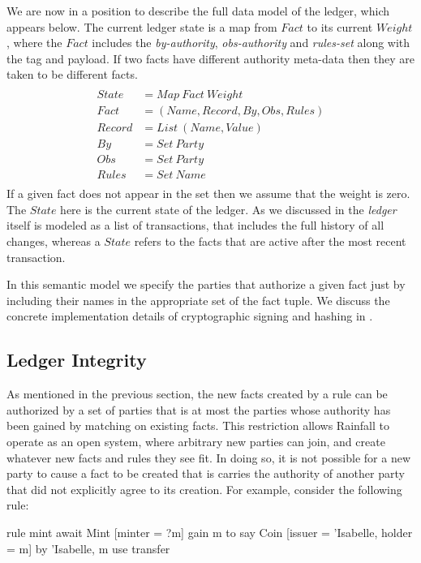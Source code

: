 We are now in a position to describe the full data model of the ledger, which appears below. The current ledger state is a map from $Fact$ to its current $Weight$, where the $Fact$ includes the \emph{by-authority}, \emph{obs-authority} and \emph{rules-set} along with the tag and payload. If two facts have different authority meta-data then they are taken to be different facts.
$$
\begin{array}{ll}
\\ State   & = Map~ Fact~ Weight
\\ Fact    & = (Name, Record, By, Obs, Rules)
\\ Record  & = List~ (Name, Value)
\\ By      & = Set~ Party
\\ Obs     & = Set~ Party
\\ Rules   & = Set~ Name
\\[1ex]

\end{array}
$$
If a given fact does not appear in the set then we assume that the weight is zero. The $State$ here is the current state of the ledger. As we discussed in \REF the \emph{ledger} itself is modeled as a list of transactions, that includes the full history of all changes, whereas a $State$ refers to the facts that are active after the most recent transaction.

In this semantic model we specify the parties that authorize a given fact just by including their names in the appropriate set of the fact tuple. We discuss the concrete implementation details of cryptographic signing and hashing in \REF.


\subsection{Ledger Integrity}
As mentioned in the previous section, the new facts created by a rule can be authorized by a set of parties that is at most the parties whose authority has been gained by matching on existing facts. This restriction allows Rainfall to operate as an open system, where arbitrary new parties can join, and create whatever new facts and rules they see fit. In doing so, it is not possible for a new party to cause a fact to be created that is carries the authority of another party that did not explicitly agree to its creation. For example, consider the following rule:

\begin{small}
\begin{code}
  rule  mint
  await Mint [minter = ?m] gain m
   to   say Coin [issuer = 'Isabelle, holder = m]
         by {'Isabelle, m} use {transfer}
\end{code}
\end{small}

